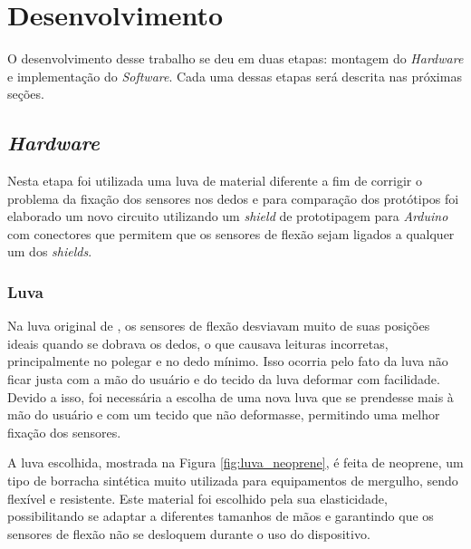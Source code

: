 \chapter{Desenvolvimento}
\label{ch:desenvolvimento}

\vspace{-1.9cm}
O desenvolvimento desse trabalho se deu em duas etapas: montagem do \textit{Hardware} e implementação do \textit{Software}. Cada uma dessas etapas será descrita nas próximas seções.

\section{\textit{Hardware}} %
\label{sec:met_hardware}

Nesta etapa foi utilizada uma luva de material diferente a fim de corrigir o problema da fixação dos sensores nos dedos e para comparação dos protótipos foi elaborado um novo circuito utilizando um \textit{shield} de prototipagem para \textit{Arduino} com conectores que permitem que os sensores de flexão sejam ligados a qualquer um dos \textit{shields}.

\subsection{Luva} %
\label{sub:luva}
Na luva original de , os sensores de flexão desviavam muito de suas posições ideais quando se dobrava os dedos, o que causava leituras incorretas, principalmente no polegar e no dedo mínimo. Isso ocorria pelo fato da luva não ficar justa com a mão do usuário e do tecido da luva deformar com facilidade. Devido a isso, foi necessária a escolha de uma nova luva que se prendesse mais à mão do usuário e  com um tecido que não deformasse, permitindo uma melhor fixação dos sensores.

A luva escolhida, mostrada na Figura \ref{fig:luva_neoprene}, é feita de neoprene, um tipo de borracha sintética muito utilizada para equipamentos de mergulho, sendo flexível e resistente. Este material foi escolhido pela sua elasticidade, possibilitando se adaptar a diferentes tamanhos de mãos e garantindo que os sensores de flexão não se desloquem durante o uso do dispositivo.

